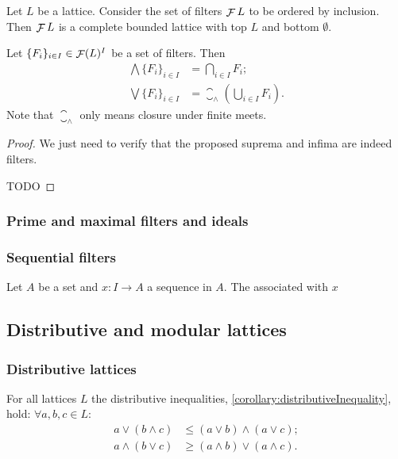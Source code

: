 \begin{proposition}
Let $L$ be a lattice. Consider the set of filters $\mathop{\mathcal{F}}{L}$ to be ordered by inclusion. Then $\mathop{\mathcal{F}}{L}$ is a complete bounded lattice with top $L$ and bottom $\emptyset$.

Let $\{F_i\}_{i\in I} \in \mathop{\mathcal{F}}(L)^I$ be a set of filters. Then
\begin{align*}
\bigwedge \{F_i\}_{i\in I} &= \bigcap_{i\in I}F_i; \\
\bigvee \{F_i\}_{i\in I} &=  \closure_\wedge\left(\bigcup_{i\in I}F_i\right).
\end{align*}
Note that $\closure_\wedge$ only means closure under finite meets.
\end{proposition}
\begin{proof}
We just need to verify that the proposed suprema and infima are indeed filters.

TODO
\end{proof}


\subsubsection{Prime and maximal filters and ideals}

\subsubsection{Sequential filters}
\begin{definition}
Let $A$ be a set and $x: I\to A$ a sequence in $A$. The  associated with $x$
\end{definition}

\subsection{Distributive and modular lattices}
\subsubsection{Distributive lattices}
For all lattices $L$ the distributive inequalities, \ref{corollary:distributiveInequality}, hold: $\forall a,b,c \in L$:
\begin{align*}
a \vee (b\wedge c) &\leq (a\vee b) \wedge (a\vee c); \\
a\wedge (b \vee c) &\geq (a\wedge b)\vee (a\wedge c).
\end{align*}

